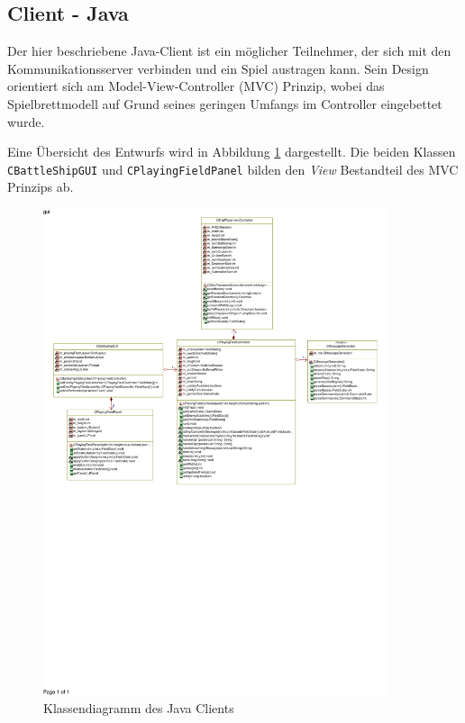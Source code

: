 \subsection{Client - Java}
\label{sec:Javaclient}

Der hier beschriebene Java-Client ist ein möglicher Teilnehmer, der sich mit den Kommunikationsserver verbinden und ein Spiel austragen kann.
Sein Design orientiert sich am Model-View-Controller (MVC) Prinzip, wobei das Spielbrettmodell auf Grund seines geringen Umfangs im Controller eingebettet wurde.

Eine Übersicht des Entwurfs wird in Abbildung \ref{fig:Javaclientklassendiagramm} dargestellt.
Die beiden Klassen \texttt{CBattleShipGUI} und \texttt{CPlayingFieldPanel} bilden den \emph{View} Bestandteil des MVC Prinzips ab.

\begin{figure}[H]
  \centering
  \includegraphics[trim=5mm 125mm 5mm 4mm,clip,width=0.9\textwidth]{images/CJavaClient.pdf}
  \caption{Klassendiagramm des Java Clients}
  \label{fig:Javaclientklassendiagramm}
\end{figure}

